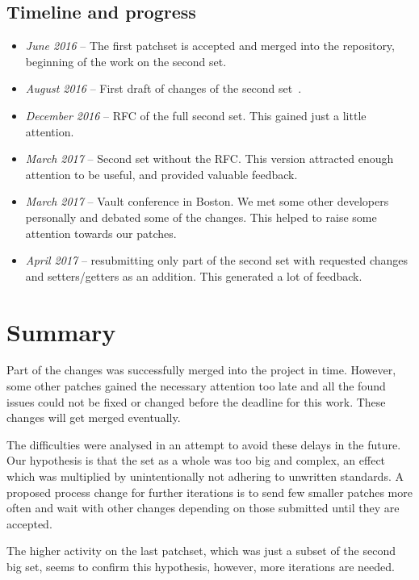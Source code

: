 \subsection{Timeline and progress}

\begin{itemize}
	\item {\em June 2016} -- The first patchset is accepted and merged into
		the repository, beginning of the work on the second set.
	\item {\em August 2016} -- First draft of changes of the second set~\cite{secondSetPreRFC}.
	\item {\em December 2016} -- RFC of the full second set. This gained just a little attention.
	\item {\em March 2017} -- Second set without the RFC. This version attracted enough attention to be useful, and provided valuable feedback.
	\item {\em March 2017} -- Vault conference in Boston. We met some
		other developers personally and debated some of the
		changes. This helped to raise some attention towards our patches.
	\item {\em April 2017} -- resubmitting only part of the second set with requested changes and setters/getters as an addition. This generated a lot of feedback.
\end{itemize}


\section{Summary}\label{chap:refactoring:summary}

Part of the changes was successfully merged into the project in time.
However, some other patches gained the necessary attention too late and all
the found issues could not be fixed or changed before the deadline for this
work. These changes will get merged eventually.

The difficulties were analysed in an attempt to avoid these delays in the future.
Our hypothesis is that the set as a whole was too big and complex, an
effect which was multiplied by unintentionally not adhering to unwritten
standards. A proposed process change for further iterations is to send few
smaller patches more often and wait with other changes depending on those
submitted until they are accepted.

The higher activity on the last patchset, which was just a subset of the second
big set, seems to confirm this hypothesis, however, more iterations are needed.

